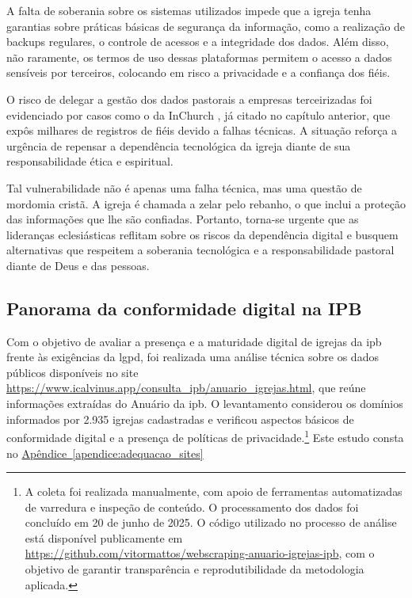 A falta de soberania sobre os sistemas utilizados impede que a igreja tenha garantias sobre práticas básicas de segurança da informação, como a realização de backups regulares, o controle de acessos e a integridade dos dados. Além disso, não raramente, os termos de uso dessas plataformas permitem o acesso a dados sensíveis por terceiros, colocando em risco a privacidade e a confiança dos fiéis.

O risco de delegar a gestão dos dados pastorais a empresas terceirizadas foi evidenciado por casos como o da InChurch \cite{almeida_inchurch_2024}, já citado no capítulo anterior, que expôs milhares de registros de fiéis devido a falhas técnicas. A situação reforça a urgência de repensar a dependência tecnológica da igreja diante de sua responsabilidade ética e espiritual.

Tal vulnerabilidade não é apenas uma falha técnica, mas uma questão de mordomia cristã. A igreja é chamada a zelar pelo rebanho, o que inclui a proteção das informações que lhe são confiadas. Portanto, torna-se urgente que as lideranças eclesiásticas reflitam sobre os riscos da dependência digital e busquem alternativas que respeitem a soberania tecnológica e a responsabilidade pastoral diante de Deus e das pessoas.

\subsection{Panorama da conformidade digital na IPB}

Com o objetivo de avaliar a presença e a maturidade digital de igrejas da \gls{ipb} frente às exigências da \gls{lgpd}, foi realizada uma análise técnica sobre os dados públicos disponíveis no site \url{https://www.icalvinus.app/consulta_ipb/anuario_igrejas.html}, que reúne informações extraídas do Anuário da \gls{ipb}. O levantamento considerou os domínios informados por 2.935 igrejas cadastradas e verificou aspectos básicos de conformidade digital e a presença de políticas de privacidade.\footnote{A coleta foi realizada manualmente, com apoio de ferramentas automatizadas de varredura e inspeção de conteúdo. O processamento dos dados foi concluído em 20 de junho de 2025. O código utilizado no processo de análise está disponível publicamente em \url{https://github.com/vitormattos/webscraping-anuario-igrejas-ipb}, com o objetivo de garantir transparência e reprodutibilidade da metodologia aplicada.} Este estudo consta no \hyperref[apendice:adequacao_sites]{Apêndice~\ref*{apendice:adequacao_sites}}

